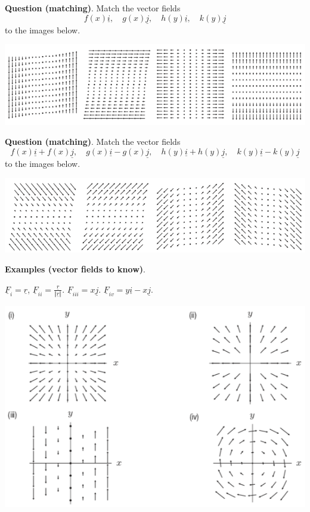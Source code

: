 \documentclass[12pt,letterpaper,noanswers]{exam}
\newcommand{\mb}[1]{\underline{#1}}
\begin{document}
\noindent\textbf{Question (matching)}.  Match the vector fields \[f(x)\mb i, \quad g(x)\mb j, \quad h(y)\mb i,\quad k(y)\mb j\] to the images below.  %

\hspace{-0.5in}\includegraphics[width=\linewidth]{img/C24p2b-18.png}
\vfill
%

\noindent\textbf{Question (matching)}.  Match the vector fields \[f(x)\mb i+f(x)\mb j,\quad g(x)\mb i - g(x)\mb j,\quad h(y)\mb i + h(y)\mb j,\quad k(y)\mb i - k(y)\mb j\] to the images below. %

\hspace{-0.5in}\includegraphics[width=\linewidth]{img/C24p3b-18.png}

\vfill


\noindent\textbf{Examples (vector fields to know)}. 

$\mb F_i = \mb r$, $\mb F_{ii} = \frac{\mb r}{\Vert \mb r\Vert}$.  $\mb F_{iii} = x\mb j$.  $\mb F_{iv} = y\mb i - x\mb j.$


\includegraphics[width=0.8\linewidth]{img/C24p4-18.png}
\end{document}
